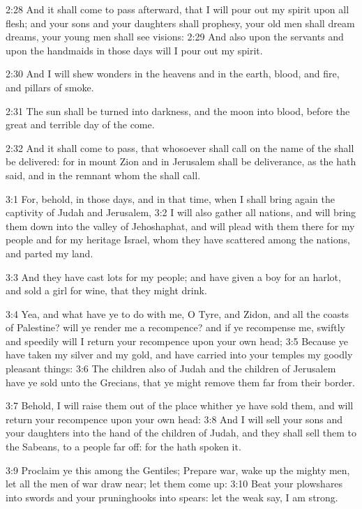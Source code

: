 2:28 And it shall come to pass afterward, that I will pour out my spirit upon all flesh; and your sons and your daughters shall prophesy, your old men shall dream dreams, your young men shall see visions: 2:29 And also upon the servants and upon the handmaids in those days will I pour out my spirit.

2:30 And I will shew wonders in the heavens and in the earth, blood, and fire, and pillars of smoke.

2:31 The sun shall be turned into darkness, and the moon into blood, before the great and terrible day of the \LORD come.

2:32 And it shall come to pass, that whosoever shall call on the name of the \LORD shall be delivered: for in mount Zion and in Jerusalem shall be deliverance, as the \LORD hath said, and in the remnant whom the \LORD shall call.

3:1 For, behold, in those days, and in that time, when I shall bring again the captivity of Judah and Jerusalem, 3:2 I will also gather all nations, and will bring them down into the valley of Jehoshaphat, and will plead with them there for my people and for my heritage Israel, whom they have scattered among the nations, and parted my land.

3:3 And they have cast lots for my people; and have given a boy for an harlot, and sold a girl for wine, that they might drink.

3:4 Yea, and what have ye to do with me, O Tyre, and Zidon, and all the coasts of Palestine? will ye render me a recompence? and if ye recompense me, swiftly and speedily will I return your recompence upon your own head; 3:5 Because ye have taken my silver and my gold, and have carried into your temples my goodly pleasant things: 3:6 The children also of Judah and the children of Jerusalem have ye sold unto the Grecians, that ye might remove them far from their border.

3:7 Behold, I will raise them out of the place whither ye have sold them, and will return your recompence upon your own head: 3:8 And I will sell your sons and your daughters into the hand of the children of Judah, and they shall sell them to the Sabeans, to a people far off: for the \LORD hath spoken it.

3:9 Proclaim ye this among the Gentiles; Prepare war, wake up the mighty men, let all the men of war draw near; let them come up: 3:10 Beat your plowshares into swords and your pruninghooks into spears: let the weak say, I am strong.

